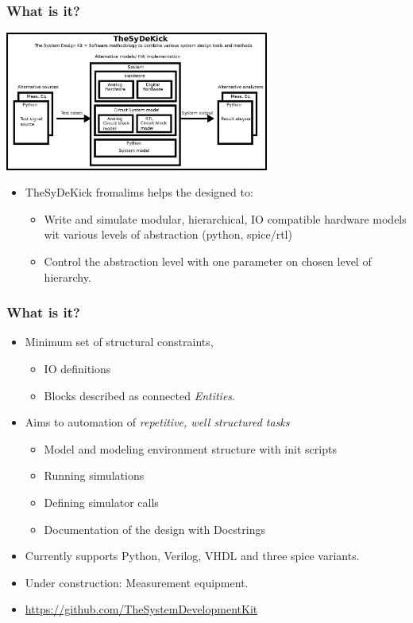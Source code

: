 \documentclass{sdkslides}
\newcommand{\sectname}{Section Name}
\begin{document}
\renewcommand{\sectname}{What is it?}
\begin{frame}[t]
    \frametitle{\sectname}
    \centering
        \includegraphics[width=0.65\textwidth]{Pics/TheSDK_block_diagram.eps}
        \begin{itemize}
            \item TheSyDeKick fromalims helps the designed to: 
            \begin{itemize}
                \item Write and simulate modular, hierarchical, IO compatible
                    hardware models wit various levels of abstraction (python,
                    spice/rtl)
                \item Control the abstraction level with one parameter on
                    chosen level of hierarchy.
            \end{itemize}
        \end{itemize}
\end{frame}


\begin{frame}[t]
    \frametitle{\sectname}
    \begin{itemize}
        \item Minimum set of structural constraints, 
            \begin{itemize}
                \item IO definitions
                \item Blocks described as connected \emph{Entities}.
            \end{itemize}
        \item Aims to automation of \emph{repetitive, well structured tasks}
            \begin{itemize}
                \item Model and modeling environment structure with init scripts
                \item Running simulations
                \item Defining simulator calls
                \item Documentation of the design with Docstrings
            \end{itemize}
        \item Currently supports Python, Verilog, VHDL and three spice
            variants.
        \item Under construction: Measurement equipment.
        \item \url{https://github.com/TheSystemDevelopmentKit}
    \end{itemize}
\end{frame}
\end{document}
